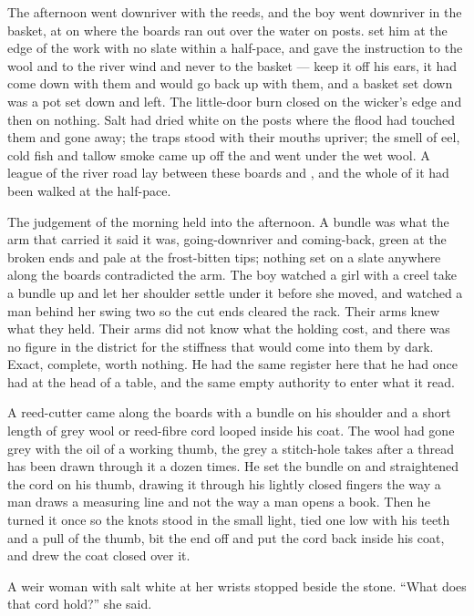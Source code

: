 The afternoon went downriver with the reeds, and the boy went downriver in the basket, at  on  where the boards ran out over the water on posts.  set him at the edge of the work with no slate within a half-pace, and gave the instruction to the wool and to the river wind and never to the basket --- keep it off his ears, it had come down with them and would go back up with them, and a basket set down was a pot set down and left. The little-door burn closed on the wicker's edge and then on nothing. Salt had dried white on the posts where the flood had touched them and gone away; the traps stood with their mouths upriver; the smell of eel, cold fish and tallow smoke came up off the  and went under the wet wool. A league of the river road lay between these boards and , and the whole of it had been walked at the half-pace.

The judgement of the morning held into the afternoon. A bundle was what the arm that carried it said it was, going-downriver and coming-back, green at the broken ends and pale at the frost-bitten tips; nothing set on a slate anywhere along the boards contradicted the arm. The boy watched a girl with a creel take a bundle up and let her shoulder settle under it before she moved, and watched a man behind her swing two so the cut ends cleared the rack. Their arms knew what they held. Their arms did not know what the holding cost, and there was no figure in the district for the stiffness that would come into them by dark. Exact, complete, worth nothing. He had the same register here that he had once had at the head of a table, and the same empty authority to enter what it read.

A reed-cutter came along the boards with a bundle on his shoulder and a short length of grey wool or reed-fibre cord looped inside his coat. The wool had gone grey with the oil of a working thumb, the grey a stitch-hole takes after a thread has been drawn through it a dozen times. He set the bundle on  and straightened the cord on his thumb, drawing it through his lightly closed fingers the way a man draws a measuring line and not the way a man opens a book. Then he turned it once so the knots stood in the small light, tied one low with his teeth and a pull of the thumb, bit the end off and put the cord back inside his coat, and drew the coat closed over it.

A weir woman with salt white at her wrists stopped beside the stone. “What does that cord hold?” she said.

